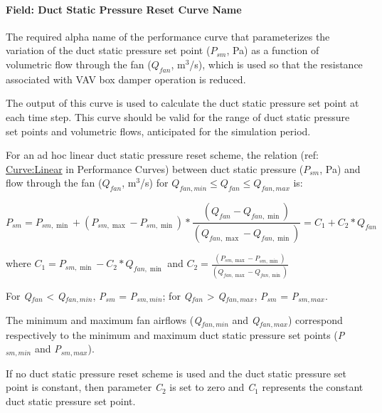 \paragraph{Field: Duct Static Pressure Reset Curve Name}\label{field-duct-static-pressure-reset-curve-name}

The required alpha name of the performance curve that parameterizes the variation of the duct static pressure set point (\(P_{sm}\), Pa) as a function of volumetric flow through the fan (\(Q_{fan}\), m\(^{3}\)/s), which is used so that the resistance associated with VAV box damper operation is reduced.

The output of this curve is used to calculate the duct static pressure set point at each time step. This curve should be valid for the range of duct static pressure set points and volumetric flows, anticipated for the simulation period.

For an ad hoc linear duct static pressure reset scheme, the relation (ref: \hyperref[curvelinear]{Curve:Linear} in Performance Curves) between duct static pressure (\(P_{sm}\), Pa) and flow through the fan (\(Q_{fan}\), m\(^{3}\)/s) for \(Q_{fan,min} \le Q_{fan} \le Q_{fan,max}\) is:

\begin{equation}
P_{sm} = P_{sm,\min } + \left( P_{sm,\max } - P_{sm,\min } \right) * \frac{{\left( {{Q_{fan}} - {Q_{fan,\min }}} \right)}}{{\left( {{Q_{fan,\max }} - {Q_{fan,\min }}} \right)}} = {C_1} + {C_2}*{Q_{fan}}
\end{equation}

where \({C_1} = {P_{sm,\min }} - {C_2}*{Q_{fan,\min }}\) and \({C_2} = \frac{{\left( {{P_{sm,\max }} - {P_{sm,\min }}} \right)}}{{\left( {{Q_{fan,\max }} - {Q_{fan,\min }}} \right)}}\)

For \emph{Q\(_{fan}\)} \textless{} \emph{Q\(_{fan,min}\)}, \emph{P\(_{sm}\)} = \emph{P\(_{sm,min}\)}; for \emph{Q\(_{fan}\)} \textgreater{} \emph{Q\(_{fan,max}\)}, \emph{P\(_{sm}\)} = \emph{P\(_{sm,max}\)}.

The minimum and maximum fan airflows (\emph{Q\(_{fan,min}\)} and \emph{Q\(_{fan,max}\)}) correspond respectively to the minimum and maximum duct static pressure set points (\emph{P\(_{sm,min}\)} and \emph{P\(_{sm,max}\)}).

If no duct static pressure reset scheme is used and the duct static pressure set point is constant, then parameter \emph{C\(_{2}\)} is set to zero and \emph{C\(_{1}\)} represents the constant duct static pressure set point.

